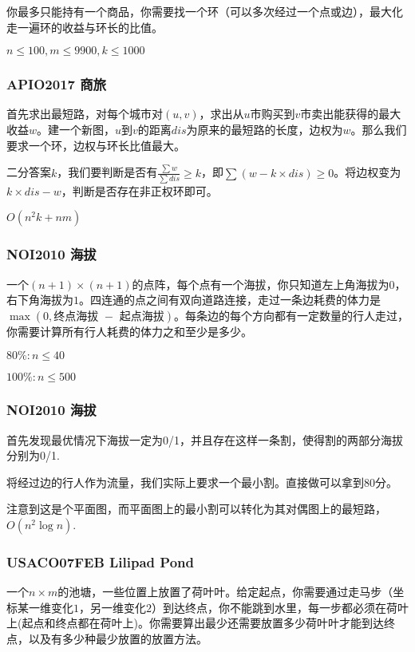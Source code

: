\documentclass[10pt]{beamer}
\begin{document}
\begin{CJK}{UTF8}{gkai}
\begin{spacing}{1.1}
\begin{frame}
	你最多只能持有一个商品，你需要找一个环（可以多次经过一个点或边），最大化走一遍环的收益与环长的比值。

	$n \le 100, m \le 9900, k \le 1000$

\end{frame}

\begin{frame}
\frametitle{APIO2017 商旅}
	首先求出最短路，对每个城市对$(u, v)$，求出从$u$市购买到$v$市卖出能获得的最大收益$w$。建一个新图，$u$到$v$的距离$dis$为原来的最短路的长度，边权为$w$。那么我们要求一个环，边权与环长比值最大。\pause

	二分答案$k$，我们要判断是否有$\frac{\sum w}{\sum dis} \ge k$，即$\sum (w - k \times dis) \ge 0$。将边权变为$k \times dis - w$，判断是否存在非正权环即可。

	$O(n^2k + nm)$

\end{frame}

\begin{frame}
\frametitle{NOI2010 海拔}

	一个$(n + 1) \times (n + 1)$的点阵，每个点有一个海拔，你只知道左上角海拔为$0$，右下角海拔为$1$。四连通的点之间有双向道路连接，走过一条边耗费的体力是$\max(0, \text{终点海拔 }-\text{ 起点海拔})$。每条边的每个方向都有一定数量的行人走过，你需要计算所有行人耗费的体力之和至少是多少。

	$80\%: n \le 40$

	$100\%: n \le 500$

\end{frame}

\begin{frame}
\frametitle{NOI2010 海拔}

	首先发现最优情况下海拔一定为0/1，并且存在这样一条割，使得割的两部分海拔分别为0/1. \pause

	将经过边的行人作为流量，我们实际上要求一个最小割。直接做可以拿到80分。\pause

	注意到这是个平面图，而平面图上的最小割可以转化为其对偶图上的最短路，$O(n^2\log n)$.

\end{frame}

\begin{frame}
\frametitle{USACO07FEB Lilipad Pond}

	一个$n \times m$的池塘，一些位置上放置了荷叶叶。给定起点，你需要通过走马步（坐标某一维变化$1$，另一维变化$2$）到达终点，你不能跳到水里，每一步都必须在荷叶上(起点和终点都在荷叶上)。你需要算出最少还需要放置多少荷叶叶才能到达终点，以及有多少种最少放置的放置方法。


\end{frame}
\end{spacing}
\end{CJK}
\end{document}
